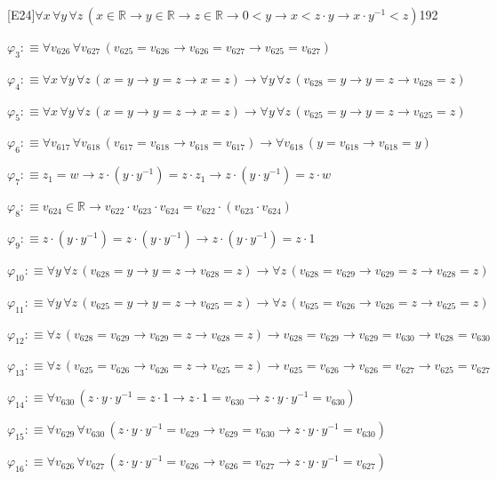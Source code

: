 \begin{fullproof}{[E24]}{$\forall x\,\forall y\,\forall z\,(x \in \mathbb{R} \to y \in \mathbb{R} \to z \in \mathbb{R} \to 0 < y \to x < z \cdot y \to x \cdot y^{-1} < z)$}{192}
\begin{abbrevlist}
\item $\varphi_{3} :\equiv \forall v_{626}\,\forall v_{627}\,(v_{625} = v_{626} \to v_{626} = v_{627} \to v_{625} = v_{627})$
\item $\varphi_{4} :\equiv \forall x\,\forall y\,\forall z\,(x = y \to y = z \to x = z) \to \forall y\,\forall z\,(v_{628} = y \to y = z \to v_{628} = z)$
\item $\varphi_{5} :\equiv \forall x\,\forall y\,\forall z\,(x = y \to y = z \to x = z) \to \forall y\,\forall z\,(v_{625} = y \to y = z \to v_{625} = z)$
\item $\varphi_{6} :\equiv \forall v_{617}\,\forall v_{618}\,(v_{617} = v_{618} \to v_{618} = v_{617}) \to \forall v_{618}\,(y = v_{618} \to v_{618} = y)$
\item $\varphi_{7} :\equiv z_{1} = w \to z \cdot (y \cdot y^{-1}) = z \cdot z_{1} \to z \cdot (y \cdot y^{-1}) = z \cdot w$
\item $\varphi_{8} :\equiv v_{624} \in \mathbb{R} \to v_{622} \cdot v_{623} \cdot v_{624} = v_{622} \cdot (v_{623} \cdot v_{624})$
\item $\varphi_{9} :\equiv z \cdot (y \cdot y^{-1}) = z \cdot (y \cdot y^{-1}) \to z \cdot (y \cdot y^{-1}) = z \cdot 1$
\item $\varphi_{10} :\equiv \forall y\,\forall z\,(v_{628} = y \to y = z \to v_{628} = z) \to \forall z\,(v_{628} = v_{629} \to v_{629} = z \to v_{628} = z)$
\item $\varphi_{11} :\equiv \forall y\,\forall z\,(v_{625} = y \to y = z \to v_{625} = z) \to \forall z\,(v_{625} = v_{626} \to v_{626} = z \to v_{625} = z)$
\item $\varphi_{12} :\equiv \forall z\,(v_{628} = v_{629} \to v_{629} = z \to v_{628} = z) \to v_{628} = v_{629} \to v_{629} = v_{630} \to v_{628} = v_{630}$
\item $\varphi_{13} :\equiv \forall z\,(v_{625} = v_{626} \to v_{626} = z \to v_{625} = z) \to v_{625} = v_{626} \to v_{626} = v_{627} \to v_{625} = v_{627}$
\item $\varphi_{14} :\equiv \forall v_{630}\,(z \cdot y \cdot y^{-1} = z \cdot 1 \to z \cdot 1 = v_{630} \to z \cdot y \cdot y^{-1} = v_{630})$
\item $\varphi_{15} :\equiv \forall v_{629}\,\forall v_{630}\,(z \cdot y \cdot y^{-1} = v_{629} \to v_{629} = v_{630} \to z \cdot y \cdot y^{-1} = v_{630})$
\item $\varphi_{16} :\equiv \forall v_{626}\,\forall v_{627}\,(z \cdot y \cdot y^{-1} = v_{626} \to v_{626} = v_{627} \to z \cdot y \cdot y^{-1} = v_{627})$

\end{abbrevlist}
\end{fullproof}

